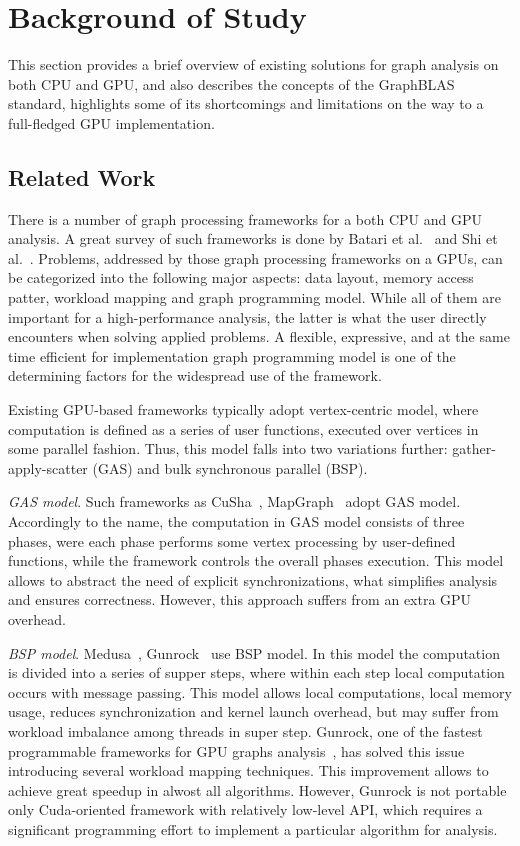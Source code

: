 \section{Background of Study}

This section provides a brief overview of existing solutions for graph analysis on both CPU and GPU, and also describes the concepts of the GraphBLAS standard, highlights some of its shortcomings and limitations on the way to a full-fledged GPU implementation.

\subsection{Related Work}

There is a number of graph processing frameworks for a both CPU and GPU analysis. A great survey of such frameworks is done by Batari et al.~\cite{article:batarfi_survey_graphs} and Shi et al.~\cite{article:shi_survey_graphs}. Problems, addressed by those graph processing frameworks on a GPUs, can be categorized into the following major aspects: data layout, memory access patter, workload mapping and graph programming model. While all of them are important for a high-performance analysis, the latter is what the user directly encounters when solving applied problems. A flexible, expressive, and at the same time efficient for implementation graph programming model is one of the determining factors for the widespread use of the framework.

Existing GPU-based frameworks typically adopt vertex-centric model, where computation is defined as a series of user functions, executed over vertices in some parallel fashion. Thus, this model falls into two variations further: gather-apply-scatter (GAS) and bulk synchronous parallel (BSP). 

\textit{GAS model}. Such frameworks as CuSha~\cite{10.1145/2600212.2600227}, MapGraph~\cite{10.1145/2621934.2621936/MapGraph} adopt GAS model. 
Accordingly to the name, the computation in GAS model consists of three phases, were each phase performs some vertex processing by user-defined functions, while the framework controls the overall phases execution. This model allows to abstract the need of explicit synchronizations, what simplifies analysis and ensures correctness. However, this approach suffers from an extra GPU overhead.

\textit{BSP model}. Medusa~\cite{6497047/Medusa}, Gunrock~\cite{7967137} use BSP model. In this model the computation is divided into a series of supper steps, where within each step local computation occurs with message passing. This model allows local computations, local memory usage, reduces synchronization and kernel launch overhead, but may suffer from workload imbalance among threads in super step. Gunrock, one of the fastest programmable frameworks for GPU graphs analysis~\cite{article:shi_survey_graphs},  has solved this issue introducing several workload mapping techniques. This improvement allows to achieve great speedup in alwost all algorithms. However, Gunrock is not portable only Cuda-oriented framework with relatively low-level API, which requires a significant programming effort to implement a particular algorithm for analysis.

